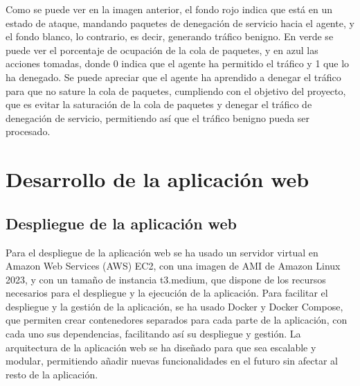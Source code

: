 
Como se puede ver en la imagen anterior, el fondo rojo indica que está en un estado de ataque, mandando paquetes de denegación de servicio hacia el agente, y el fondo blanco, lo contrario, es decir, generando tráfico benigno. En verde se puede ver el porcentaje de ocupación de la cola de paquetes, y en azul las acciones tomadas, donde 0 indica que el agente ha permitido el tráfico y 1 que lo ha denegado. Se puede apreciar que el agente ha aprendido a denegar el tráfico para que no sature la cola de paquetes, cumpliendo con el objetivo del proyecto, que es evitar la saturación de la cola de paquetes y denegar el tráfico de denegación de servicio, permitiendo así que el tráfico benigno pueda ser procesado.

\section{Desarrollo de la aplicación web}


\subsection{Despliegue de la aplicación web}
Para el despliegue de la aplicación web se ha usado un servidor virtual en Amazon Web Services (AWS) EC2, con una imagen de AMI de Amazon Linux 2023, y con un tamaño de instancia t3.medium, que dispone de los recursos necesarios para el despliegue y la ejecución de la aplicación.
Para facilitar el despliegue y la gestión de la aplicación, se ha usado Docker y Docker Compose, que permiten crear contenedores separados para cada parte de la aplicación, con cada uno sus dependencias, facilitando así su despliegue y gestión.
La arquitectura de la aplicación web se ha diseñado para que sea escalable y modular, permitiendo añadir nuevas funcionalidades en el futuro sin afectar al resto de la aplicación.

